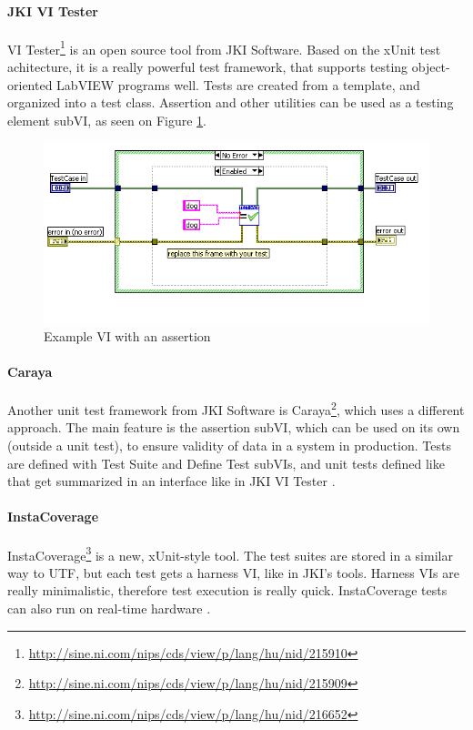 \paragraph{JKI VI Tester}
VI Tester\footnote{\url{http://sine.ni.com/nips/cds/view/p/lang/hu/nid/215910}} is an open source tool from JKI Software. Based on the xUnit test achitecture, it is a really powerful test framework, that supports testing object-oriented LabVIEW programs well. Tests are created from a template, and organized into a test class. Assertion and other utilities can be used as a testing element subVI, as seen on Figure \ref{fig:vitester}. \cite{vitesterwiki}
\begin{figure}
\centering
\includegraphics[width=120mm,keepaspectratio]{figures/vitester.png}
\caption{Example VI with an assertion} 
\label{fig:vitester}
\end{figure}
\paragraph{Caraya}
Another unit test framework from JKI Software is Caraya\footnote{\url{http://sine.ni.com/nips/cds/view/p/lang/hu/nid/215909}}, which uses a different approach. The main feature is the assertion subVI, which can be used on its own (outside a unit test), to ensure validity of data in a system in production. Tests are defined with Test Suite and Define Test subVIs, and unit tests defined like that get summarized in an interface like in JKI VI Tester \cite{carayapages}. 
\paragraph{InstaCoverage}
InstaCoverage\footnote{\url{http://sine.ni.com/nips/cds/view/p/lang/hu/nid/216652}} is a new, xUnit-style tool. The test suites are stored in a similar way to UTF, but each test gets a harness VI, like in JKI's tools. Harness VIs are really minimalistic, therefore test execution is really quick. InstaCoverage tests can also run on real-time hardware \cite{icovsite}. 
